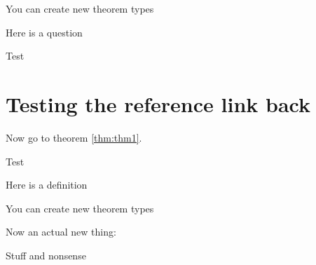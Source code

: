 \documentclass[17pt,english,a4paper]{extarticle}
\theoremstyle{plain}
\theoremstyle{definition}
\theoremstyle{plain}
\theoremstyle{plain}
\theoremstyle{plain}
\theoremstyle{definition}
\theoremstyle{definition}
\theoremstyle{definition}
\theoremstyle{remark}
\theoremstyle{plain}
\let\BeginKnitrBlock\begin \let\EndKnitrBlock\end
\renewcommand{\;}{\,}
\begin{document}
\BeginKnitrBlock{Solution}
\protect\hypertarget{Solution:sol1}{}{\iffalse{} \label{sol:sol1} \fi{}}You can create new theorem types
\EndKnitrBlock{Solution}

\BeginKnitrBlock{Exercises}
\protect\hypertarget{Exercises:unnamed-chunk-6}{}{\iffalse{} (\) \fi{}}Here is a question
\EndKnitrBlock{Exercises}

\BeginKnitrBlock{solution}
\iffalse{} {Solution. } \fi{}

Test
\EndKnitrBlock{solution}

\hypertarget{testing-the-reference-link-back}{%
\section{Testing the reference link back}\label{testing-the-reference-link-back}}

Now go to theorem \ref{thm:thm1}.

\BeginKnitrBlock{solution}
\iffalse{} {Solution. } \fi{}

Test
\EndKnitrBlock{solution}

\BeginKnitrBlock{definition}
\label{def:truth} Here is a definition
\EndKnitrBlock{definition}

\BeginKnitrBlock{Thought}[Bar of \ref{thm:thm1}]
\protect\hypertarget{Thought:tho1}{}{\iffalse{} \label{tho:tho1} \fi{}}You can create new theorem types
\EndKnitrBlock{Thought}

Now an actual new thing:
\BeginKnitrBlock{Thought}
\protect\hypertarget{Thought:tho2}{}{\iffalse{} \label{tho:tho2} \fi{}}Stuff and nonsense
\EndKnitrBlock{Thought}
\end{document}
